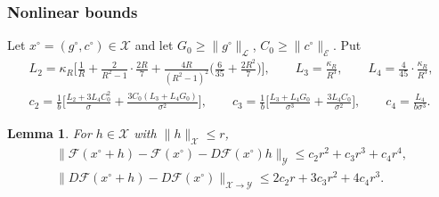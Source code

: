 \documentclass[11pt]{amsart}
\newtheorem{lemma}[theorem]{Lemma}
\theoremstyle{definition}
\theoremstyle{remark}
\numberwithin{equation}{section}
\newcommand{\Fc}{\mathcal{F}}
\newcommand{\nrm}[1]{\lVert #1\rVert}
\begin{document}
\subsubsection*{Nonlinear bounds}
Let $x^\circ=(g^\circ,c^\circ)\in\mathcal X$ and let $G_0\geq\nrm{g^\circ}_{\mathcal L}$, $C_0\geq\nrm{c^\circ}_{\mathcal E}$. Put
\begin{gather*}
L_2=\kappa_R\Big[\frac1R+\frac2{R^2-1}\cdot\frac{2R}7+\frac{4R}{(R^2-1)^2}\Big(\frac6{35}+\frac{2R^2}7\Big)\Big],\qquad L_3=\frac{\kappa_R}{R^3},\qquad L_4=\frac4{45}\cdot\frac{\kappa_R}{R^3},\\
c_2=\frac1b\Big[\frac{L_2+3L_4C_0^2}\sigma+\frac{3C_0(L_3+L_4G_0)}{\sigma^2}\Big],\qquad c_3=\frac1b\Big[\frac{L_3+L_4G_0}{\sigma^3}+\frac{3L_4C_0}{\sigma^2}\Big],\qquad c_4=\frac{L_4}{b\sigma^3}.
\end{gather*}

\begin{lemma}\label{r3:lem-nonlinear}
For $h\in\mathcal X$ with $\nrm h_{\mathcal X}\leq r$,
\begin{gather*}
\nrm{\Fc(x^\circ+h)-\Fc(x^\circ)-D\Fc(x^\circ)h}_{\mathcal Y}\leq c_2r^2+c_3r^3+c_4r^4,\\
\nrm{D\Fc(x^\circ+h)-D\Fc(x^\circ)}_{\mathcal X\to\mathcal Y}\leq2c_2r+3c_3r^2+4c_4r^3 .
\end{gather*}
\end{lemma}
\end{document}
